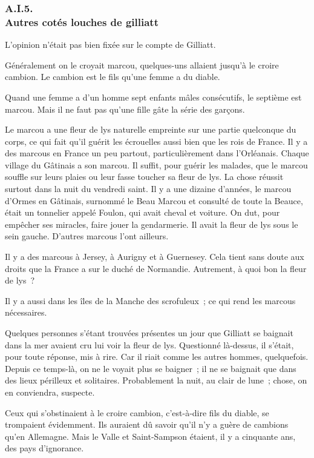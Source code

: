 \documentclass[french,twoside]{book} %
\begin{document}
 \subsubsection[{A.I.5. Autres cotés louches de gilliatt}]{A.I.5. \\
Autres cotés louches de gilliatt}
\noindent L’opinion n’était pas bien fixée sur le compte de Gilliatt.\par
Généralement on le croyait marcou, quelques-uns allaient jusqu’à le croire cambion. Le cambion est le fils qu’une femme a du diable.\par
Quand une femme a d’un homme sept enfants mâles consécutifs, le septième est marcou. Mais il ne faut pas qu’une fille gâte la série des garçons.\par
Le marcou a une fleur de lys naturelle empreinte sur une partie quelconque du corps, ce qui fait qu’il guérit les écrouelles aussi bien que les rois de France. Il y a des marcous en France un peu partout, particulièrement dans l’Orléanais. Chaque village du Gâtinais a son marcou. Il suffit, pour guérir les malades, que le marcou souffle sur leurs plaies ou leur fasse toucher sa fleur de lys. La chose réussit surtout dans la nuit du vendredi saint. Il y a une dizaine d’années, le marcou d’Ormes en Gâtinais, surnommé le Beau Marcou et consulté de toute la Beauce, était un tonnelier appelé  Foulon, qui avait cheval et voiture. On dut, pour empêcher ses miracles, faire jouer la gendarmerie. Il avait la fleur de lys sous le sein gauche. D’autres marcous l’ont ailleurs.\par
Il y a des marcous à Jersey, à Aurigny et à Guernesey. Cela tient sans doute aux droits que la France a sur le duché de Normandie. Autrement, à quoi bon la fleur de lys ?\par
Il y a aussi dans les îles de la Manche des scrofuleux ; ce qui rend les marcous nécessaires.\par
Quelques personnes s’étant trouvées présentes un jour que Gilliatt se baignait dans la mer avaient cru lui voir la fleur de lys. Questionné là-dessus, il s’était, pour toute réponse, mis à rire. Car il riait comme les autres hommes, quelquefois. Depuis ce temps-là, on ne le voyait plus se baigner ; il ne se baignait que dans des lieux périlleux et solitaires. Probablement la nuit, au clair de lune ; chose, on en conviendra, suspecte.\par
Ceux qui s’obstinaient à le croire cambion, c’est-à-dire fils du diable, se trompaient évidemment. Ils auraient dû savoir qu’il n’y a guère de cambions qu’en Allemagne. Mais le Valle et Saint-Sampson étaient, il y a cinquante ans, des pays d’ignorance.\par
\end{document}
